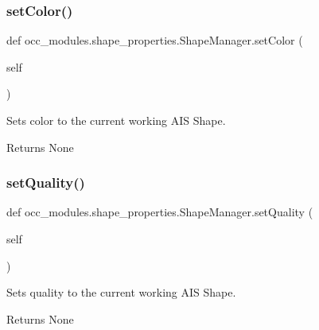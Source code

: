 \subsubsection{\texorpdfstring{set\+Color()}{setColor()}}
{\footnotesize\ttfamily def occ\+\_\+modules.\+shape\+\_\+properties.\+Shape\+Manager.\+set\+Color (\begin{DoxyParamCaption}\item[{}]{self }\end{DoxyParamCaption})}



Sets color to the current working A\+IS Shape. 

\begin{DoxyReturn}{Returns}
None 
\end{DoxyReturn}
\hypertarget{classocc__modules_1_1shape__properties_1_1_shape_manager_abe8c1dbcfe98b9f86a0560dd1e8b853a}{}\label{classocc__modules_1_1shape__properties_1_1_shape_manager_abe8c1dbcfe98b9f86a0560dd1e8b853a} 
\subsubsection{\texorpdfstring{set\+Quality()}{setQuality()}}
{\footnotesize\ttfamily def occ\+\_\+modules.\+shape\+\_\+properties.\+Shape\+Manager.\+set\+Quality (\begin{DoxyParamCaption}\item[{}]{self }\end{DoxyParamCaption})}



Sets quality to the current working A\+IS Shape. 

\begin{DoxyReturn}{Returns}
None 
\end{DoxyReturn}
\hypertarget{classocc__modules_1_1shape__properties_1_1_shape_manager_a1cab1ea26a1cd0091d88106b6b4715bb}{}\label{classocc__modules_1_1shape__properties_1_1_shape_manager_a1cab1ea26a1cd0091d88106b6b4715bb} 
